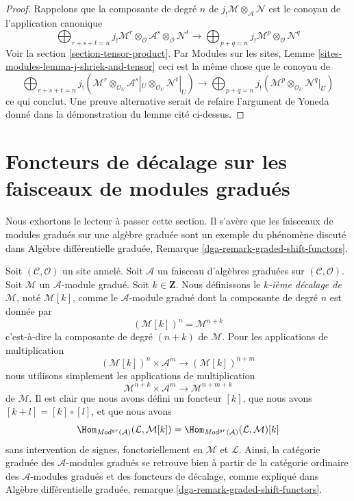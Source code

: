 \begin{proof}
Rappelons que la composante de degré $n$ de $j_!\mathcal{M} \otimes_\mathcal{A} \mathcal{N}$ est le conoyau de l'application canonique
$$
\bigoplus\nolimits_{r + s + t = n}
j_!\mathcal{M}^r \otimes_\mathcal{O}
\mathcal{A}^s \otimes_\mathcal{O}
\mathcal{N}^t
\longrightarrow
\bigoplus\nolimits_{p + q = n}
j_!\mathcal{M}^p \otimes_\mathcal{O} \mathcal{N}^q
$$
Voir la section \ref{section-tensor-product}.
Par Modules sur les sites, Lemme \ref{sites-modules-lemma-j-shriek-and-tensor}  ceci est la même chose que le conoyau de
$$
\bigoplus\nolimits_{r + s + t = n}
j_!(\mathcal{M}^r \otimes_{\mathcal{O}_U}
\mathcal{A}^s|_U \otimes_{\mathcal{O}_U}
\mathcal{N}^t|_U)
\longrightarrow
\bigoplus\nolimits_{p + q = n}
j_!(\mathcal{M}^p \otimes_{\mathcal{O}_U} \mathcal{N}^q|_U)
$$
ce qui conclut.
Une preuve alternative serait de refaire l'argument de Yoneda donné dans la démonstration du lemme cité ci-dessus.
\end{proof}








\section{Foncteurs de décalage sur les faisceaux de modules gradués}
\label{section-shift}

\noindent
Nous exhortons le lecteur à passer cette section.
Il s'avère que les faisceaux de modules gradués sur une algèbre graduée sont un exemple du phénomène discuté dans Algèbre différentielle graduée, Remarque \ref{dga-remark-graded-shift-functors}.

\medskip\noindent
Soit $(\mathcal{C}, \mathcal{O})$ un site annelé.
Soit $\mathcal{A}$ un faisceau d'algèbres graduées sur $(\mathcal{C}, \mathcal{O})$.
Soit $\mathcal{M}$ un $\mathcal{A}$-module gradué.
Soit $k \in \mathbf{Z}$.
Nous définissons le {\it $k$-ième décalage de} $\mathcal{M}$, noté $\mathcal{M}[k]$, comme le $\mathcal{A}$-module gradué dont la composante de degré $n$ est donnée par
$$
(\mathcal{M}[k])^n = \mathcal{M}^{n + k}
$$
c'est-à-dire la composante de degré $(n + k)$ de $\mathcal{M}$.
Pour les applications de multiplication
$$
(\mathcal{M}[k])^n \times \mathcal{A}^m
\longrightarrow
(\mathcal{M}[k])^{n + m}
$$
nous utilisons simplement les applications de multiplication
$$
\mathcal{M}^{n + k} \times \mathcal{A}^m
\longrightarrow
\mathcal{M}^{n + m + k}
$$
de $\mathcal{M}$.
Il est clair que nous avons défini un foncteur $[k]$, que nous avons $[k + l] = [k] \circ [l]$, et que nous avons
$$
\Hom_{\textit{Mod}^{gr}(\mathcal{A})}(\mathcal{L}, \mathcal{M}[k]) =
\Hom_{\textit{Mod}^{gr}(\mathcal{A})}(\mathcal{L}, \mathcal{M})[k]
$$
sans intervention de signes, fonctoriellement en $\mathcal{M}$ et $\mathcal{L}$.
Ainsi, la catégorie graduée des $\mathcal{A}$-modules gradués se retrouve bien à partir de la catégorie ordinaire des $\mathcal{A}$-modules gradués et des foncteurs de décalage, comme expliqué dans Algèbre différentielle graduée, remarque \ref{dga-remark-graded-shift-functors}.

